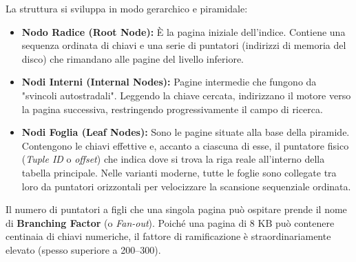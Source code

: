 La struttura si sviluppa in modo gerarchico e piramidale:

\begin{itemize}
    \item \textbf{Nodo Radice (Root Node):} È la pagina iniziale dell'indice. Contiene una sequenza ordinata di chiavi e una serie di puntatori (indirizzi di memoria del disco) che rimandano alle pagine del livello inferiore.
    \item \textbf{Nodi Interni (Internal Nodes):} Pagine intermedie che fungono da "svincoli autostradali". Leggendo la chiave cercata, indirizzano il motore verso la pagina successiva, restringendo progressivamente il campo di ricerca.
    \item \textbf{Nodi Foglia (Leaf Nodes):} Sono le pagine situate alla base della piramide. Contengono le chiavi effettive e, accanto a ciascuna di esse, il puntatore fisico (\textit{Tuple ID} o \textit{offset}) che indica dove si trova la riga reale all'interno della tabella principale. Nelle varianti moderne, tutte le foglie sono collegate tra loro da puntatori orizzontali per velocizzare la scansione sequenziale ordinata.
\end{itemize}



Il numero di puntatori a figli che una singola pagina può ospitare prende il nome di \textbf{Branching Factor} (o \textit{Fan-out}). Poiché una pagina di $8\text{ KB}$ può contenere centinaia di chiavi numeriche, il fattore di ramificazione è straordinariamente elevato (spesso superiore a 200–300).

